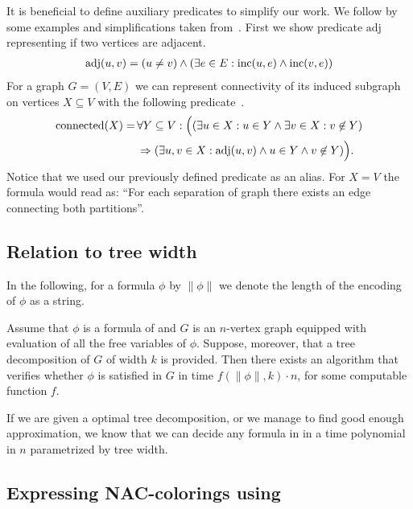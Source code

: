 It is beneficial to define auxiliary predicates to simplify our work.
We follow by some examples and simplifications taken from~\cite{book_parametrized_algorithms}.
First we show predicate \( \text{adj} \) representing if two vertices are adjacent.
%
\begin{align}
	\text{adj}(u, v) = (u \ne v) \land (\exists e \in E : \text{inc} (u, e) \land \text{inc} (v, e)) \notag
\end{align}
%
For a graph \( G = (V, E) \) we can represent connectivity of its induced subgraph
on vertices \( X \subseteq V \) with the following predicate~\cite{book_parametrized_algorithms}.
%
\begin{align}
	\text{connected}(X) = \, &
	\forall Y \subseteq V : \Big(
	(
	\exists u \in X : u \in Y \land
	\exists v \in X : v \not\in Y
	)
	\notag                     \\ &
	\Rightarrow
	(
	\exists u, v \in X : \text{adj}(u, v) \land u \in Y \land v \not\in Y
	)\Big). \notag
\end{align}
%
Notice that we used our previously defined predicate as an alias.
For \( X = V \) the formula would read as:
``For each separation of graph there exists an edge connecting both partitions''.

\subsection{Relation to tree width}

In the following, for a formula \( \phi \) by \( \|\phi\| \)
we denote the length of the encoding of \( \phi \) as a string.
%
\begin{theorem}%
	\label{theorem:courcelles_theorem}%
	Assume that \( \phi \) is a formula of \MSO{} and
	\( G \) is an \( n \)-vertex graph equipped
	with evaluation of all the free variables of \( \phi \).
	Suppose, moreover, that a tree decomposition of \( G \) of width \( k \) is provided.
	Then there exists an algorithm that verifies whether \( \phi \)
	is satisfied in \( G \) in time \( f (\|\phi\|, k) \cdot n \),
	for some computable function \( f \).
\end{theorem}
%
If we are given a optimal tree decomposition, or we manage to find good enough
approximation, we know that we can decide any formula in \MSO{} in a time
polynomial in \( n \) parametrized by tree width.

\subsection{Expressing NAC-colorings using \MSO{}}

